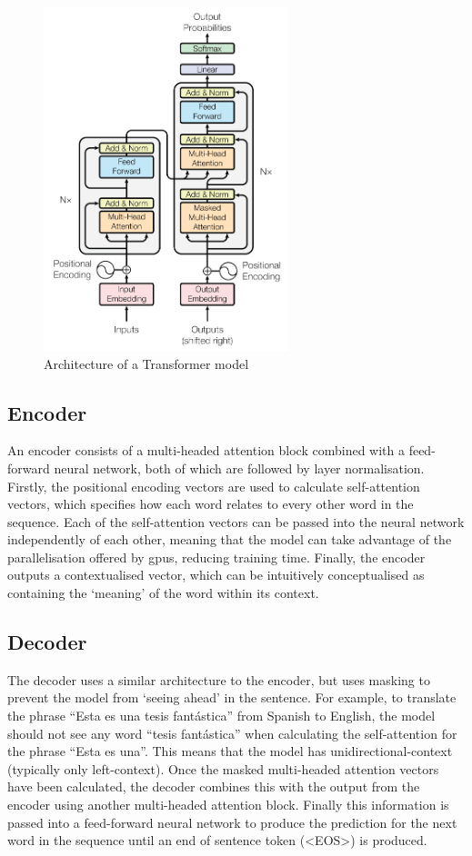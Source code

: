 \begin{figure}[h]
    \centering
    \includegraphics[height=10cm,trim={0 0 0cm 0cm},clip]{Paper/images/transformer.png}
    \caption{Architecture of a Transformer model \citep{vaswani2017attention}}
    \label{fig:transformer_architecture}
\end{figure}

\subsection{Encoder}
An encoder consists of a multi-headed attention block combined with a feed-forward neural network, both of which are followed by layer normalisation. Firstly, the positional encoding vectors are used to calculate self-attention vectors, which specifies how each word relates to every other word in the sequence. Each of the self-attention vectors can be passed into the neural network independently of each other, meaning that the model can take advantage of the parallelisation offered by \acrshort{gpu}s, reducing training time. Finally, the encoder outputs a contextualised vector, which can be intuitively conceptualised as containing the `meaning' of the word within its context.

\subsection{Decoder}
The decoder uses a similar architecture to the encoder, but uses masking to prevent the model from `seeing ahead' in the sentence. For example, to translate the phrase ``Esta es una tesis fantástica'' from Spanish to English, the model should not see any word ``tesis fantástica'' when calculating the self-attention for the phrase ``Esta es una''. This means that the model has unidirectional-context (typically only left-context). Once the masked multi-headed attention vectors have been calculated, the decoder combines this with the output from the encoder using another multi-headed attention block. Finally this information is passed into a feed-forward neural network to produce the prediction for the next word in the sequence until an end of sentence token (<EOS>) is produced.


